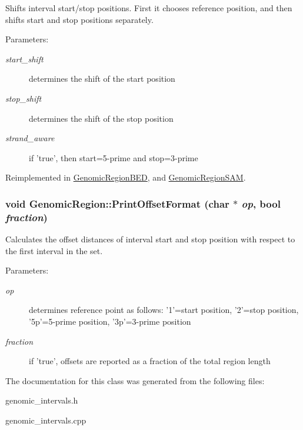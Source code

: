 Shifts interval start/stop positions. First it chooses reference position, and then shifts start and stop positions separately. 

\begin{Desc}
\item[Parameters:]
\begin{description}
\item[{\em start\_\-shift}]determines the shift of the start position \item[{\em stop\_\-shift}]determines the shift of the stop position \item[{\em strand\_\-aware}]if 'true', then start=5-prime and stop=3-prime \end{description}
\end{Desc}


Reimplemented in \hyperlink{classGenomicRegionBED_fd2f05cec2af5186794f40f221e040b1}{GenomicRegionBED}, and \hyperlink{classGenomicRegionSAM_fb2701ba1a521ae2c07ea0ace2f9ee77}{GenomicRegionSAM}.\hypertarget{classGenomicRegion_33d1e5544b3fb81e8c19468b91920b1d}{
\subsubsection[PrintOffsetFormat]{\setlength{\rightskip}{0pt plus 5cm}void GenomicRegion::PrintOffsetFormat (char $\ast$ {\em op}, \/  bool {\em fraction})}}
\label{classGenomicRegion_33d1e5544b3fb81e8c19468b91920b1d}


Calculates the offset distances of interval start and stop position with respect to the first interval in the set. 

\begin{Desc}
\item[Parameters:]
\begin{description}
\item[{\em op}]determines reference point as follows: '1'=start position, '2'=stop position, '5p'=5-prime position, '3p'=3-prime position \item[{\em fraction}]if 'true', offsets are reported as a fraction of the total region length \end{description}
\end{Desc}


The documentation for this class was generated from the following files:\begin{CompactItemize}
\item 
genomic\_\-intervals.h\item 
genomic\_\-intervals.cpp\end{CompactItemize}
